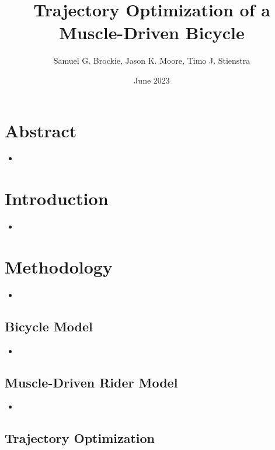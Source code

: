 \documentclass{article}
\title{Trajectory Optimization of a Muscle-Driven Bicycle}
\author{Samuel G. Brockie, Jason K. Moore, Timo J. Stienstra}
\date{June 2023}
\begin{document}
\maketitle

\section{Abstract}

\begin{itemize}
    \item 
\end{itemize}

\section{Introduction} \label{sec:introduction}

\begin{itemize}
    \item {}
\end{itemize}

\section{Methodology}

\begin{itemize}
    \item 
\end{itemize}

\subsection{Bicycle Model}

\begin{itemize}
    \item 
\end{itemize}

\subsection{Muscle-Driven Rider Model}

\begin{itemize}
    \item 
\end{itemize}

\subsection{Trajectory Optimization}
\end{document}
